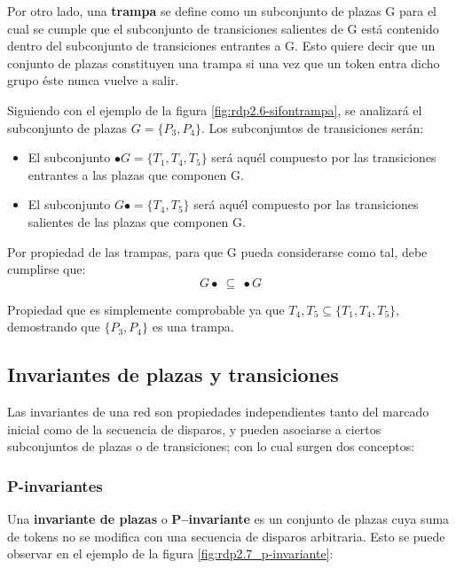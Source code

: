 Por otro lado, una \textbf{trampa} se define como un subconjunto de plazas G para el cual se cumple que el subconjunto de transiciones salientes de G está contenido dentro del subconjunto de transiciones entrantes a G. Esto quiere decir que un conjunto de plazas constituyen una trampa si una vez que un token entra dicho grupo éste nunca vuelve
a salir.

Siguiendo con el ejemplo de la figura \ref{fig:rdp2.6-sifontrampa}, se analizará el subconjunto de plazas $G = \{P_3 , P_4\}$.  Los subconjuntos de transiciones serán:
\begin{itemize}
    \item El subconjunto $\bullet G = \{T_1 , T_4 , T_5 \}$ será aquél compuesto por las transiciones entrantes a las plazas que componen G.
    \item El subconjunto $G \bullet = \{T_4, T_5 \}$ será aquél compuesto por las transiciones salientes de las plazas que componen G.
\end{itemize}

\noindent Por propiedad de las trampas, para que G pueda considerarse como tal, debe cumplirse que:
\begin{equation}
    G \bullet \ \subseteq \ \bullet G
\end{equation}

Propiedad que es simplemente comprobable ya que ${T_4 , T_5} \subseteq \{T_1 , T_4 , T_5 \}$, demostrando que $\{P_3 , P_4\}$ es una trampa.


\subsection{Invariantes de plazas y transiciones}
Las invariantes de una red son propiedades independientes tanto del marcado inicial como de la secuencia de disparos, y pueden asociarse a ciertos subconjuntos de plazas o de transiciones; con lo cual surgen dos conceptos:

\subsubsection{P-invariantes}
Una \textbf{invariante de plazas} o \textbf{P–invariante} es un conjunto de plazas cuya suma de tokens no se modifica con una secuencia de disparos arbitraria. 
Esto se puede observar en el ejemplo de la figura \ref{fig:rdp2.7_p-invariante}:

